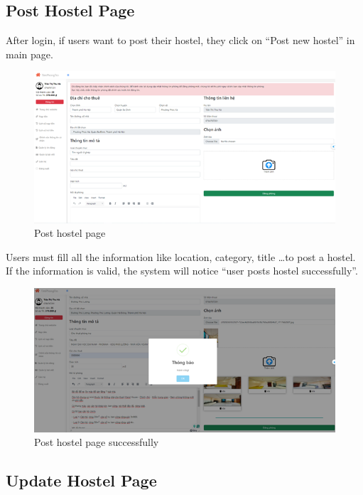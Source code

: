 \documentclass[../Main.tex]{subfiles}
\begin{document}
\subsection{Post Hostel Page}

After login, if users want to post their hostel, they click on ``Post new hostel'' in main page.

\begin{figure}[H]
    \centering
    \includegraphics[width=\textwidth]{Figure/Picture34.png}
    \caption{Post hostel page}
\end{figure}

Users must fill all the information like location, category, title \dots to post a hostel.
If the information is valid, the system will notice ``user posts hostel successfully''.

\begin{figure}[H]
    \centering
    \includegraphics[width=\textwidth]{Figure/Picture35.png}
    \caption{Post hostel page successfully}
\end{figure}

\subsection{Update Hostel Page}
\end{document}
